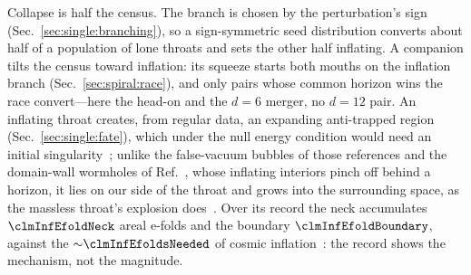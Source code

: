 \documentclass[twocolumn,floatfix,aps,prd,superscriptaddress,nofootinbib]{revtex4-2}
\begin{document}
Collapse is half the census. The branch is chosen by the perturbation's sign (Sec.~\ref{sec:single:branching}), so a sign-symmetric seed distribution converts about half of a population of lone throats and sets the other half inflating. A companion tilts the census toward inflation: its squeeze starts both mouths on the inflation branch (Sec.~\ref{sec:spiral:race}), and only pairs whose common horizon wins the race convert---here the head-on and the $d=6$ merger, no $d=12$ pair. An inflating throat creates, from regular data, an expanding anti-trapped region (Sec.~\ref{sec:single:fate}), which under the null energy condition would need an initial singularity~\cite{farhi_guth1987,blau1987}; unlike the false-vacuum bubbles of those references and the domain-wall wormholes of Ref.~\cite{deng2017}, whose inflating interiors pinch off behind a horizon, it lies on our side of the throat and grows into the surrounding space, as the massless throat's explosion does~\cite{shinkai2002}. Over its record the neck accumulates $\clmInfEfoldNeck$ areal e-folds and the boundary $\clmInfEfoldBoundary$, against the ${\sim}\clmInfEfoldsNeeded$ of cosmic inflation~\cite{liddle2003}: the record shows the mechanism, not the magnitude.
\end{document}
